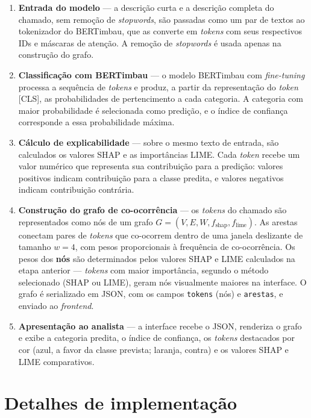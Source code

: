 \documentclass[
    12pt,                %
    openright,           %
    oneside,             %
    a4paper,             %
    english,             %
    brazil               %
]{abntex2}
\begin{document}
\begin{enumerate}
    \item \textbf{Entrada do modelo} — a descrição curta e a descrição completa do chamado, sem remoção de \textit{stopwords}, são passadas como um par de textos ao tokenizador do BERTimbau, que as converte em \textit{tokens} com seus respectivos IDs e máscaras de atenção. A remoção de \textit{stopwords} é usada apenas na construção do grafo.

    \item \textbf{Classificação com BERTimbau} — o modelo BERTimbau com \textit{fine-tuning} processa a sequência de \textit{tokens} e produz, a partir da representação do \textit{token} [CLS], as probabilidades de pertencimento a cada categoria. A categoria com maior probabilidade é selecionada como predição, e o índice de confiança corresponde a essa probabilidade máxima.

    \item \textbf{Cálculo de explicabilidade} — sobre o mesmo texto de entrada, são calculados os valores SHAP e as importâncias LIME. Cada \textit{token} recebe um valor numérico que representa sua contribuição para a predição: valores positivos indicam contribuição para a classe predita, e valores negativos indicam contribuição contrária.

    \item \textbf{Construção do grafo de co-ocorrência} — os \textit{tokens} do chamado são representados como nós de um grafo $G = (V, E, W, f_{\text{shap}}, f_{\text{lime}})$. As arestas conectam pares de \textit{tokens} que co-ocorrem dentro de uma janela deslizante de tamanho $w = 4$, com pesos proporcionais à frequência de co-ocorrência. Os pesos dos \textbf{nós} são determinados pelos valores SHAP e LIME calculados na etapa anterior — \textit{tokens} com maior importância, segundo o método selecionado (SHAP ou LIME), geram nós visualmente maiores na interface. O grafo é serializado em JSON, com os campos \texttt{tokens} (nós) e \texttt{arestas}, e enviado ao \textit{frontend}.

    \item \textbf{Apresentação ao analista} — a interface recebe o JSON, renderiza o grafo e exibe a categoria predita, o índice de confiança, os \textit{tokens} destacados por cor (azul, a favor da classe prevista; laranja, contra) e os valores SHAP e LIME comparativos.
\end{enumerate}

\section{Detalhes de implementação}
\end{document}
